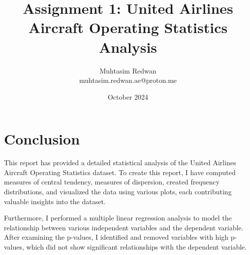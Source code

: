 \documentclass[a4paper,12pt]{article}
\title{Assignment 1: United Airlines Aircraft Operating Statistics Analysis}
\author{Muhtasim Redwan \\ muhtasim.redwan.ae@proton.me}
\date{October 2024}
\begin{document}

\maketitle







\section*{Conclusion}
This report has provided a detailed statistical analysis of the United Airlines Aircraft Operating Statistics dataset. To create this report, I have computed measures of central tendency, measures of dispersion, created frequency distributions, and visualized the data using various plots, each contributing valuable insights into the dataset.

Furthermore, I performed a multiple linear regression analysis to model the relationship between various independent variables and the dependent variable. After examining the p-values, I identified and removed variables with high p-values, which did not show significant relationships with the dependent variable.
\end{document}
